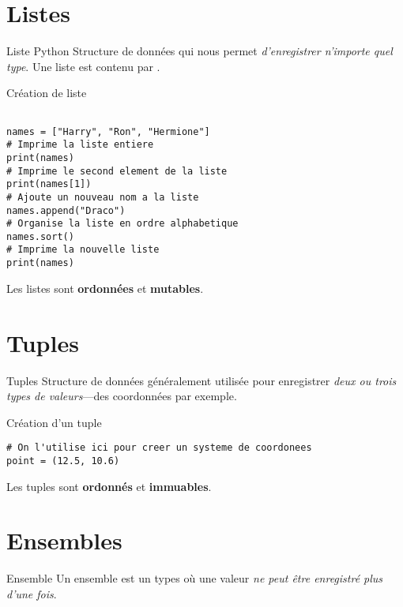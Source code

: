 \documentclass{report}
\begin{document}
\section{Listes}
\begin{DefG*}{Liste Python}{}
	Structure de données qui nous permet \textit{d'enregistrer n'importe quel type}. Une liste est contenu par \entouree[gray]{\texttt{\footnotesize{[...]}}}. 
\end{DefG*}

\begin{EExample*}{Création de liste}{}
\begin{lstlisting}[style=PythonDraculaWhite]

names = ["Harry", "Ron", "Hermione"]
# Imprime la liste entiere 
print(names)
# Imprime le second element de la liste
print(names[1])
# Ajoute un nouveau nom a la liste
names.append("Draco")
# Organise la liste en ordre alphabetique
names.sort()
# Imprime la nouvelle liste
print(names)
\end{lstlisting}
\end{EExample*}
\begin{note}
Les listes sont \textbf{ordonnées} et \textbf{mutables}.
\end{note}



\section{Tuples}
\begin{DefG*}{Tuples}{}
	Structure de données généralement utilisée pour enregistrer \textit{deux ou trois types de valeurs}—des coordonnées par exemple.
\end{DefG*}
\begin{EExample*}{Création d'un tuple}{}
\begin{lstlisting}[style=PythonDraculaWhite]
# On l'utilise ici pour creer un systeme de coordonees 
point = (12.5, 10.6)
\end{lstlisting}
\end{EExample*}
\begin{note}
Les tuples sont \textbf{ordonnés} et \textbf{immuables}.
\end{note}




\section{Ensembles}	
\begin{DefG*}{Ensemble}{}
	Un ensemble est un types où une valeur \textit{ne peut être enregistré plus d'une fois}.
\end{DefG*}
\end{document}
